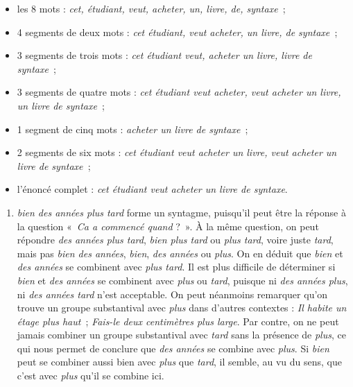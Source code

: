 {\begin{itemize}
\item les 8 mots : \textit{cet, étudiant, veut, acheter, un, livre, de, syntaxe~};
\item 4 segments de deux mots : \textit{cet étudiant, veut acheter, un livre, de syntaxe~};
\item 3 segments de trois mots : \textit{cet étudiant veut, acheter un livre, livre de syntaxe~};
\item 3 segments de quatre mots : \textit{cet étudiant veut acheter, veut acheter un livre, un livre de syntaxe~};
\item 1 segment de cinq mots : \textit{acheter un livre de syntaxe~};
\item 2 segments de six mots : \textit{cet étudiant veut acheter un livre, veut acheter un livre de syntaxe~};
\item l’énoncé complet : \textit{cet étudiant veut acheter un livre de syntaxe}.
\end{itemize}

\begin{enumerate}[label=\alph*.]
\item \textit{bien des années plus tard} forme un syntagme, puisqu’il peut être la réponse à la question «~\textit{Ca a commencé quand} ?~». À la même question, on peut répondre \textit{des années plus tard}, \textit{bien plus tard} ou \textit{plus tard}, voire juste \textit{tard}, mais pas \textit{bien des années}, \textit{bien}, \textit{des années} ou \textit{plus}. On en déduit que \textit{bien} et \textit{des années} se combinent avec \textit{plus tard}. Il est plus difficile de déterminer si \textit{bien} et \textit{des années} se combinent avec \textit{plus} ou \textit{tard}, puisque ni \textit{des années plus}, ni \textit{des années tard} n’est acceptable. On peut néanmoins remarquer qu’on trouve un groupe substantival avec \textit{plus} dans d’autres contextes : \textit{Il habite un étage plus haut~}; \textit{Fais-le deux centimètres plus large}. Par contre, on ne peut jamais combiner un groupe substantival avec \textit{tard} sans la présence de \textit{plus}, ce qui nous permet de conclure que \textit{des années} se combine avec \textit{plus}. Si \textit{bien} peut se combiner aussi bien avec \textit{plus} que \textit{tard}, il semble, au vu du sens, que c’est avec \textit{plus} qu’il se combine ici.
   

\begin{center}
\end{center}
\end{enumerate}}
